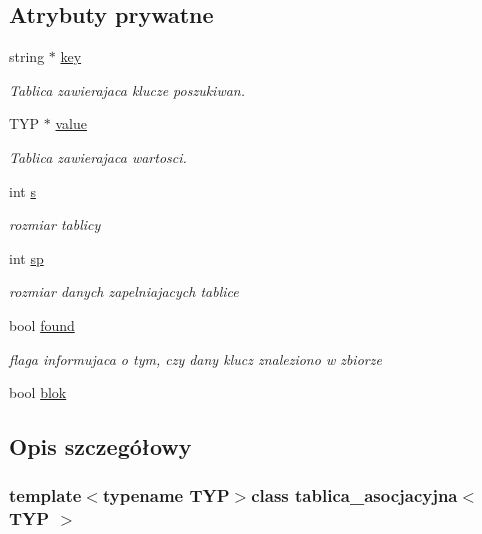 \subsection*{\-Atrybuty prywatne}
\begin{DoxyCompactItemize}
\item 
string $\ast$ \hyperlink{classtablica__asocjacyjna_aefde9ad3347d42f36cab258144bacc1f}{key}
\begin{DoxyCompactList}\small\item\em \-Tablica zawierajaca klucze poszukiwan. \end{DoxyCompactList}\item 
\-T\-Y\-P $\ast$ \hyperlink{classtablica__asocjacyjna_a28719743b86b0a16db652afda20b665c}{value}
\begin{DoxyCompactList}\small\item\em \-Tablica zawierajaca wartosci. \end{DoxyCompactList}\item 
int \hyperlink{classtablica__asocjacyjna_a4a9d8aa0a03fd1ccf2fa7980d61bc197}{s}
\begin{DoxyCompactList}\small\item\em rozmiar tablicy \end{DoxyCompactList}\item 
int \hyperlink{classtablica__asocjacyjna_a2af0a8be0f335f5ad09f908cb08c0039}{sp}
\begin{DoxyCompactList}\small\item\em rozmiar danych zapelniajacych tablice \end{DoxyCompactList}\item 
bool \hyperlink{classtablica__asocjacyjna_aa3423d398d1a6b96e3f42398a2ce5a1e}{found}
\begin{DoxyCompactList}\small\item\em flaga informujaca o tym, czy dany klucz znaleziono w zbiorze \end{DoxyCompactList}\item 
bool \hyperlink{classtablica__asocjacyjna_a384365c022138ea28ce079e0173e00ab}{blok}
\end{DoxyCompactItemize}


\subsection{\-Opis szczegółowy}
\subsubsection*{template$<$typename \-T\-Y\-P$>$class tablica\-\_\-asocjacyjna$<$ T\-Y\-P $>$}

